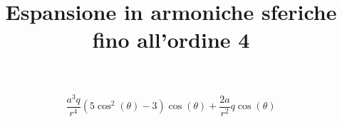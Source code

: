 \documentclass[11pt]{article}
\title{Espansione in armoniche sferiche fino all'ordine 4}
\begin{document}
 
\maketitle 


\[ \frac{a^{3} q}{r^{4}} \left(5 \cos^{2}{\left (\theta \right )} - 3\right) \cos{\left (\theta \right )} + \frac{2 a}{r^{2}} q \cos{\left (\theta \right )} \] 
\end{document}
